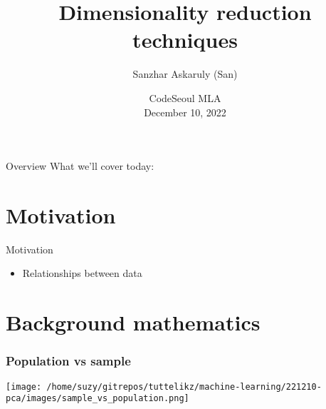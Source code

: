 \documentclass{beamer}
\title[CodeSeoul] %
  {Dimensionality reduction techniques}
\author[Machine Learning Afternoons] %
  {Sanzhar Askaruly (San)}
\institute[] %
  { Ulsan National Institute of Science and Technology\newline
    Ph.D. Candidate in Biomedical Engineering}
\date[December 10]
{CodeSeoul MLA \\December 10, 2022}
\begin{document}
    \begin{frame}
    \titlepage %
    \end{frame}

    \begin{frame}{Overview}
      What we'll cover today:
      \tableofcontents
    \end{frame}
    
    \section{Motivation} %
    \begin{frame}{Motivation}
        \begin{itemize}
            \item Relationships between data
        \end{itemize}
    \end{frame}

    \section{Background mathematics}
    \begin{frame}
        \frametitle{Population vs sample}
        \begin{center}
            \texttt{[image: /home/suzy/gitrepos/tuttelikz/machine-learning/221210-pca/images/sample\_vs\_population.png]}
        \end{center}
    \end{frame}
\end{document}
